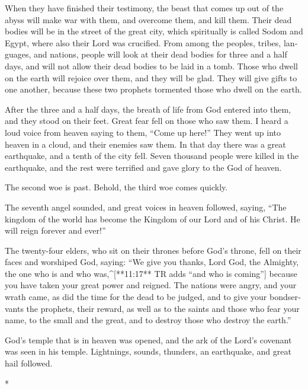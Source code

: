 \begin{paracols}{2}
\begin{english}
 When they have finished their testimony, the beast that comes up out of the abyss will make war with them, and overcome them, and kill them.  Their dead bodies will be in the street of the great city, which spiritually is called Sodom and Egypt, where also their Lord was crucified.  From among the peoples, tribes, languages, and nations, people will look at their dead bodies for three and a half days, and will not allow their dead bodies to be laid in a tomb.  Those who dwell on the earth will rejoice over them, and they will be glad. They will give gifts to one another, because these two prophets tormented those who dwell on the earth. 

 After the three and a half days, the breath of life from God entered into them, and they stood on their feet. Great fear fell on those who saw them.  I heard a loud voice from heaven saying to them, “Come up here!” They went up into heaven in a cloud, and their enemies saw them.  In that day there was a great earthquake, and a tenth of the city fell. Seven thousand people were killed in the earthquake, and the rest were terrified and gave glory to the God of heaven. 

 The second woe is past. Behold, the third woe comes quickly. 

 The seventh angel sounded, and great voices in heaven followed, saying, “The kingdom of the world has become the Kingdom of our Lord and of his Christ. He will reign forever and ever!” 

 The twenty-four elders, who sit on their thrones before God’s throne, fell on their faces and worshiped God,  saying: “We give you thanks, Lord God, the Almighty, the one who is and who was,^[**11:17** TR adds “and who is coming”] because you have taken your great power and reigned.  The nations were angry, and your wrath came, as did the time for the dead to be judged, and to give your bondservants the prophets, their reward, as well as to the saints and those who fear your name, to the small and the great, and to destroy those who destroy the earth.” 

 God’s temple that is in heaven was opened, and the ark of the Lord’s covenant was seen in his temple. Lightnings, sounds, thunders, an earthquake, and great hail followed. 

\end{english}
\switchcolumn[0]*


\end{paracols}
